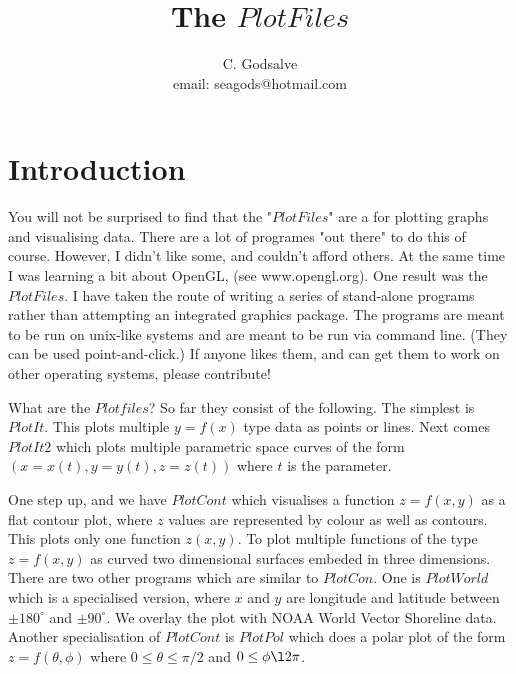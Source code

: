 \documentclass[12pt]{article}
\begin{document}

\thispagestyle{empty}


\title{The $PlotFiles$}

\author{C. Godsalve \\
   email: seagods@hotmail.com}

\maketitle

\tableofcontents


\section{Introduction}

You will not be surprised to find that the "$PlotFiles$" are a for 
plotting graphs and visualising data. There are a lot of programes
"out there" to do this of course. However, I didn't like some, and couldn't
afford others. At the same time I was learning a bit about OpenGL,
(see www.opengl.org). One result was the $PlotFiles$. I have taken the route
of writing a series of stand-alone programs rather than attempting 
an integrated graphics package. The programs are meant to be run
on unix-like systems and are meant to be run via command line.
(They can be used point-and-click.) If anyone likes them, and can get
them to work on other operating systems, please contribute!

What are the $Plotfiles$? So far they consist of the following.
The simplest is $PlotIt$. This plots multiple $y=f(x)$ type data
as points or lines. Next comes $PlotIt2$ which plots multiple parametric
space curves of the form $(x=x(t),y=y(t), z=z(t))$ where $t$ is the parameter.

One step up, and we have $PlotCont$ which visualises a function
 $z=f(x,y)$ as a flat contour plot, where $z$ values are represented
by colour as well as contours. This plots only one function $z(x,y)$.
To plot multiple functions of the type $z=f(x,y)$ as curved two 
dimensional surfaces embeded in three dimensions. There are 
two other programs which are similar to $PlotCon$. One is $PlotWorld$
which is a specialised version, where $x$ and $y$ are longitude
and latitude between $\pm 180^\circ$ and $\pm 90^\circ$. We 
overlay the plot with NOAA World Vector Shoreline data. 
Another specialisation of $PlotCont$ is $PlotPol$ which
 does a polar plot of the form $z=f(\theta,\phi)$ where
 $ 0 \le \theta \le \pi/2$ and  $ 0 \le \phi \l  2\pi$.
\end{document}
